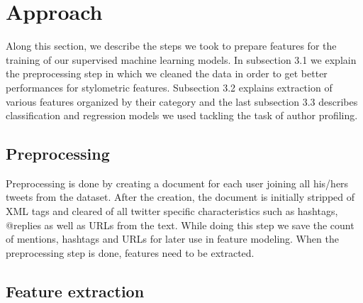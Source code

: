 \documentclass[10pt, a4paper]{article}
\begin{document}
\section{Approach}

Along this section, we describe the steps we took to prepare features for the training of our supervised machine learning models. In subsection 3.1 we explain the preprocessing step in which we cleaned the data in order to get better performances for stylometric features. Subsection 3.2 explains extraction of various features organized by their category and the last subsection 3.3 describes classification and regression models we used tackling the task of author profiling.

\subsection{Preprocessing}

Preprocessing is done by creating a document for each user joining all his/hers tweets from the dataset. After the creation, the document is initially stripped of XML tags and cleared of all twitter specific characteristics such as hashtags, @replies as well as URLs from the text. While doing this step we save the count of mentions, hashtags and URLs for later use in feature modeling. When the preprocessing step is done, features need to be extracted. \\

\subsection{Feature extraction} 
\end{document}
